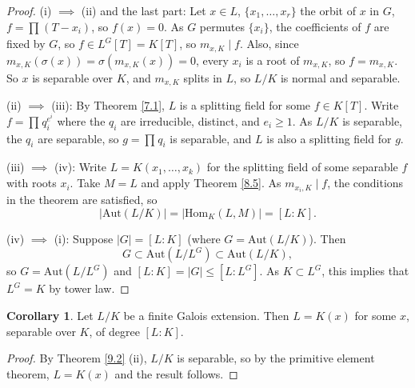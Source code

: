 \documentclass{article}
\theoremstyle{definition}
\newtheorem{cor}[theorem]{Corollary}
\begin{document}
\begin{proof}
    (i) $\implies $ (ii) and the last part: Let $x \in L$, $\{x_1,\ldots,x_r\}$ the orbit of $x$ in $G$, $f = \prod_{}^{} (T-x_i)$, so $f(x)=0$. As $G$ permutes $\{x_i\}$, the coefficients of $f$ are fixed by $G$, so $f \in L^G[T] = K[T]$, so $m_{x,K} \mid f$. Also, since $m_{x,K}(\sigma(x)) = \sigma(m_{x,K}(x))=0$, every $x_i$ is a root of $m_{x,K}$, so $f = m_{x,K}$. So $x$ is separable over $K$, and $m_{x,K}$ splits in $L$, so $L/K$ is normal and separable.
    \vspace{1mm}

    (ii) $\implies$ (iii): By Theorem \ref{7.1}, $L$ is a splitting field for some $f \in K[T]$. Write $f = \prod_{}^{} q_i^{e^i}$ where the $q_i$ are irreducible, distinct, and $e_i \ge 1$. As $L/K$ is separable, the $q_i$ are separable, so $g= \prod_{}^{} q_i$ is separable, and $L$ is also a splitting field for $g$.
    \vspace{1mm}

    (iii) $\implies$ (iv): Write $L=K(x_1,\ldots,x_k)$ for the splitting field of some separable $f$ with roots $x_i$. Take $M = L$ and apply Theorem \ref{8.5}. As $m_{x_i,K} \mid f$, the conditions in the theorem are satisfied, so $$|\text{Aut}(L/K)|=|\text{Hom}_K(L,M)|=[L : K].$$

    (iv) $\implies$ (i): Suppose $|G|=[L:K]$ (where $G = \text{Aut}(L/K)$). Then $$G \subset \text{Aut}(L/L^G) \subset \text{Aut}(L/K),$$ so $G = \text{Aut}(L/L^G)$ and $[L : K] = |G| \le [L : L^G]$. As $K \subset L^G$, this implies that $L^G = K$ by tower law.
\end{proof}
\begin{cor}\label{9.3}
    Let $L/K$ be a finite Galois extension. Then $L=K(x)$ for some $x$, separable over $K$, of degree $[L:K]$.
\end{cor}
\begin{proof}
    By Theorem \ref{9.2} (ii), $L/K$ is separable, so by the primitive element theorem, $L=K(x)$ and the result follows.
\end{proof}
\end{document}
